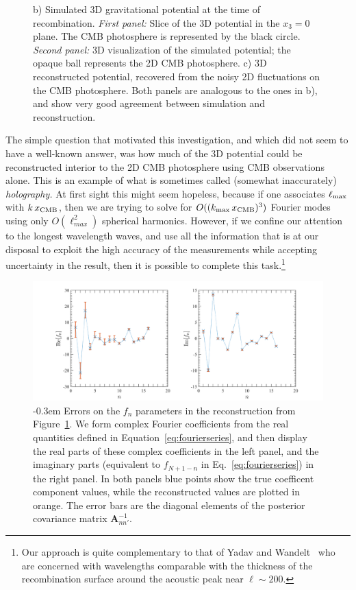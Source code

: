 \documentclass[psfig,12pt]{article}
\def\ni{\noindent}
\begin{document}
{\begin{figure}[t]
{{  b) Simulated 3D gravitational potential at the time
of recombination.  {\it First panel: } Slice of the 3D potential in the
$x_3=0$ plane. The CMB photosphere is represented by the black circle.  {\it Second panel: } 3D visualization of the simulated potential; the opaque ball represents the 2D CMB photosphere. c) 3D reconstructed potential, recovered from the noisy 2D fluctuations on the CMB photosphere. Both panels are analogous to the ones in b), and show very good agreement between simulation and reconstruction.
}}
\label{Fig:Mockreconstruction}
\end{figure}


\ni{\bf Preliminary Results:}
The simple question that motivated this investigation, and which did not
seem to have a well-known answer, was how much of the 3D potential could
be reconstructed interior to the 2D CMB photosphere using CMB
observations alone. This is an example of what is sometimes called (somewhat inaccurately) {\it
holography.} At first sight this might seem hopeless, because if one
associates $\ell_{\rm max}$ with $k\,x_{\rm CMB}$, then we are trying to
solve for $O((k_{\rm max}\,x_{\rm CMB})^3)$ Fourier modes using only
$O(\ell_{max}^2)$ spherical harmonics. However, if we confine our
attention to the longest wavelength waves, and
use all the information that is at our disposal to exploit the high
accuracy of the measurements while accepting uncertainty in the result,
then it is possible to complete this task.\footnote{Our approach is
quite complementary to that of Yadav and Wandelt~\cite{Yadav:2005} who
are concerned with wavelengths comparable with the thickness of the
recombination surface around the acoustic peak near $\ell\sim200$.}

\begin{figure}[t]
\vspace{-1cm}
\centering\includegraphics[width=0.8\linewidth]{figures/errorrec.pdf}
\caption{
\openup -0.3em
{\footnotesize
Errors on the $f_n$ parameters in the reconstruction from
Figure~\ref{Fig:Mockreconstruction}. We form complex Fourier
coefficients from the real quantities defined in
Equation~\ref{eq:fourierseries}, and then display the real parts of
these complex coefficients in the left panel, and the imaginary parts
(equivalent to $f_{N+1-n}$ in Eq.~\ref{eq:fourierseries}) in the right
panel. In both panels blue points show the true coefficent component
values, while the reconstructed values are plotted in orange. The error
bars are the diagonal elements of the posterior covariance matrix
$\mathbf{A}_{nn'}^{-1}$. }}
\label{Fig:recerror}
\end{figure}

}
\end{document}
